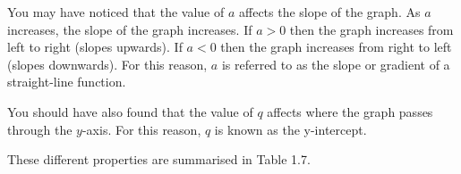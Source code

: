 You may have noticed that the value of $a$ affects the slope of the graph. As $a$ increases, the slope of the graph increases. If $a>0$ then the graph increases from left to right (slopes upwards). If $a<0$ then the graph increases from right to left (slopes downwards). For this reason, $a$ is referred to as the slope or gradient of a straight-line function.\par 
You should have also found that the value of $q$ affects where the graph passes through the $y$-axis. For this reason, $q$ is known as the y-intercept.\par 
These different properties are summarised in Table 1.7.\par 
\setlength\mytablespace{6\tabcolsep}
\addtolength\mytablespace{4\arrayrulewidth}
\setlength\mytablewidth{\linewidth}
\setlength\mytableroom{\mytablewidth}
\addtolength\mytableroom{-\mytablespace}
\setlength\myfixedwidth{0pt}
\setlength\mystarwidth{\mytableroom}
\addtolength\mystarwidth{-\myfixedwidth}
\divide{}
